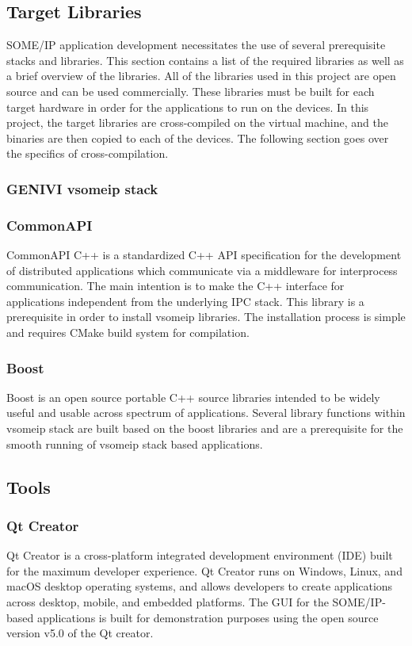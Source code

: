 \subsection{Target Libraries}
SOME/IP application development necessitates the use of several prerequisite stacks and libraries. This section contains a list of the required libraries as well as a brief overview of the libraries. All of the libraries used in this project are open source and can be used commercially. These libraries must be built for each target hardware in order for the applications to run on the devices. In this project, the target libraries are cross-compiled on the virtual machine, and the binaries are then copied to each of the devices. The following section goes over the specifics of cross-compilation.

\subsubsection{GENIVI vsomeip stack}

\subsubsection{CommonAPI}
CommonAPI C++ is a standardized C++ API specification for the development of distributed applications which communicate via a middleware for interprocess communication\cite{b_commonapi}. The main intention is to make the C++ interface for applications independent from the underlying IPC stack\cite{b_commonapi}. This library is a prerequisite in order to install vsomeip libraries. The installation process is simple and requires CMake build system for compilation.

\subsubsection{Boost}
Boost is an open source portable C++ source libraries intended to be widely useful and usable across spectrum of applications\cite{b_boost}. Several library functions within vsomeip stack are built based on the boost libraries and are a prerequisite for the smooth running of vsomeip stack based applications. 

\subsection{Tools}
\subsubsection{Qt Creator}
Qt Creator is a cross-platform integrated development environment (IDE) built for the maximum developer experience\cite{b_QtCreator}. Qt Creator runs on Windows, Linux, and macOS desktop operating systems, and allows developers to create applications across desktop, mobile, and embedded platforms\cite{b_QtCreator}. The GUI for the SOME/IP-based applications is built for demonstration purposes using the open source version v5.0 of the Qt creator.


